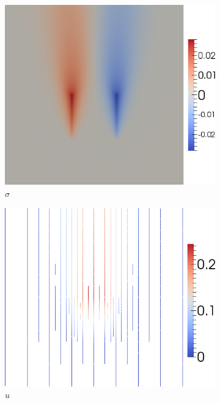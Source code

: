 \documentclass[18pt,xcolor=table]{beamer}
\begin{document}
\begin{frame}[t]
\begin{columns}[t]
\begin{column}[c]{0.7\textwidth}
\begin{figure}[ht]
\begin{subfigure}[t]{0.45\textwidth}
\centering
\includegraphics[height=0.8\textwidth]{SpaceTimeHeat/PulseSource/sigma.png}
\\$\sigma$\\\vspace{1ex}
\end{subfigure}
\begin{subfigure}[t]{0.45\textwidth}
\centering
\includegraphics[height=0.8\textwidth]{SpaceTimeHeat/PulseSource/uhat.png}
\\$\hat u$
\end{subfigure}

\end{figure}
\end{column}
\end{columns}
\end{frame}
\end{document}
